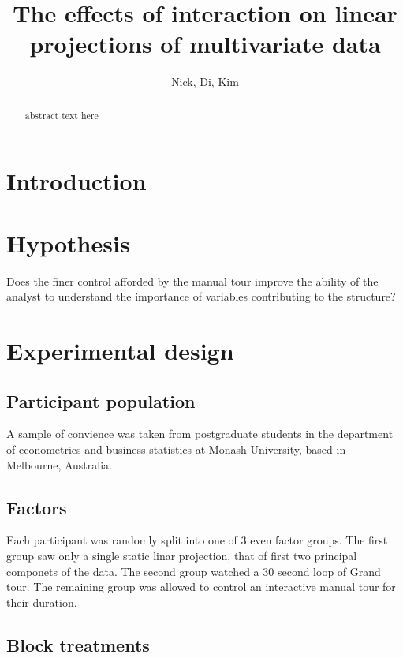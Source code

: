 \documentclass[]{article}
\title{The effects of interaction on linear projections of multivariate data}
\author{Nick, Di, Kim}
\date{}
\begin{document}
\maketitle
\begin{abstract}
abstract text here
\end{abstract}

\hypertarget{introduction}{%
\section{Introduction}\label{introduction}}

\hypertarget{hypothesis}{%
\section{Hypothesis}\label{hypothesis}}

Does the finer control afforded by the manual tour improve the ability
of the analyst to understand the importance of variables contributing to
the structure?

\hypertarget{sec:results}{%
\section{Experimental design}\label{sec:results}}

\hypertarget{participant-population}{%
\subsection{Participant population}\label{participant-population}}

A sample of convience was taken from postgraduate students in the
department of econometrics and business statistics at Monash University,
based in Melbourne, Australia.

\hypertarget{sec:vis_methods}{%
\subsection{Factors}\label{sec:vis_methods}}

Each participant was randomly split into one of 3 even factor groups.
The first group saw only a single static linar projection, that of first
two principal componets of the data. The second group watched a 30
second loop of Grand tour. The remaining group was allowed to control an
interactive manual tour for their duration.

\hypertarget{block-treatments}{%
\subsection{Block treatments}\label{block-treatments}}
\end{document}
